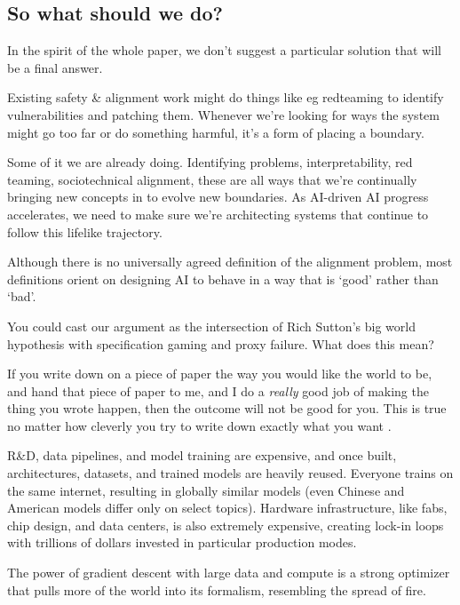 \subsection{So what should we do?}

In the spirit of the whole paper, we don't suggest a particular solution that will be a final answer.

Existing safety \& alignment work might do things like eg redteaming to identify vulnerabilities and patching them. Whenever we're looking for ways the system might go too far or do something harmful, it's a form of placing a boundary. 

Some of it we are already doing. Identifying problems, interpretability, red teaming, sociotechnical alignment, these are all ways that we're continually bringing new concepts in to evolve new boundaries. As AI-driven AI progress accelerates, we need to make sure we're architecting systems that continue to follow this lifelike trajectory. 



Although there is no universally agreed definition of the alignment problem, most definitions orient on designing AI to behave in a way that is `good' rather than `bad'. 

You could cast our argument as the intersection of Rich Sutton's big world hypothesis \citep{javed2024big} with specification gaming and proxy failure. What does this mean?

If you write down on a piece of paper the way you would like the world to be, and hand that piece of paper to me, and I do a \textit{really} good job of making the thing you wrote happen, then the outcome will not be good for you. This is true no matter how cleverly you try to write down exactly what you want \citep{bostrom2014superintelligence, wiener1960some, russell2019human, krakovna2020specification}. 

R\&D, data pipelines, and model training are expensive, and once built, architectures, datasets, and trained models are heavily reused. Everyone trains on the same internet, resulting in globally similar models (even Chinese and American models differ only on select topics). Hardware infrastructure, like fabs, chip design, and data centers, is also extremely expensive, creating lock-in loops with trillions of dollars invested in particular production modes.

The power of gradient descent with large data and compute is a strong optimizer that pulls more of the world into its formalism, resembling the spread of fire. 

